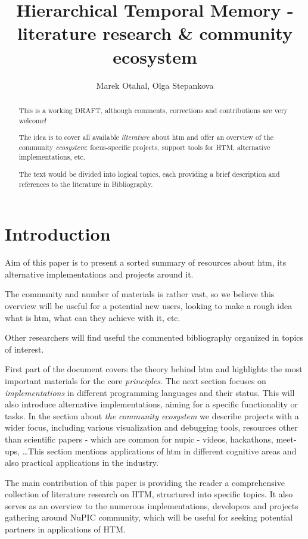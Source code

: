 \documentclass[a4,IEEEconf]{article}
\title{Hierarchical Temporal Memory - literature research \& community ecosystem}
\author{Marek Otahal, Olga Stepankova}
\begin{document}
\maketitle



\begin{abstract}
This is a working DRAFT, although comments, corrections and contributions are very welcome! 

The idea is to cover all available \textit{literature} about \gls{htm} and offer an overview of the community \textit{ecosystem}: focus-specific projects, support tools for HTM, alternative implementations, etc. 

The text would be divided into logical topics, each providing a brief description and references to the literature in Bibliography.
\end{abstract}

\tableofcontents
\printglossaries

\section{Introduction}
Aim of this paper is to present a sorted summary of resources about \gls{htm}, its alternative implementations and projects around it. 

The community and number of materials is rather vast, so we believe this overview will be useful for a potential new users, looking to make a rough idea what is \gls{htm}, what can they achieve with it, etc. 

Other researchers will find useful the commented bibliography organized in topics of interest. 

First part of the document covers the theory behind \gls{htm} and highlights the most important materials for the core \textit{principles}. The next section focuses on \textit{implementations} in different programming languages and their status. This will also introduce alternative implementations, aiming for a specific functionality or tasks. In the section about \textit{the community ecosystem} we describe projects with a wider focus, including various visualization and debugging tools, resources other than scientific papers - which are common for \gls{nupic} - videos, hackathons, meet-ups, \dots This section mentions applications of \gls{htm} in different cognitive areas and also practical applications in the industry. 

The main contribution of this paper is providing the reader a comprehensive collection of literature research on HTM, structured into specific topics. It also serves as an overview to the numerous implementations, developers and projects gathering around NuPIC community, which will be useful for seeking potential partners in applications of HTM. 
\end{document}
